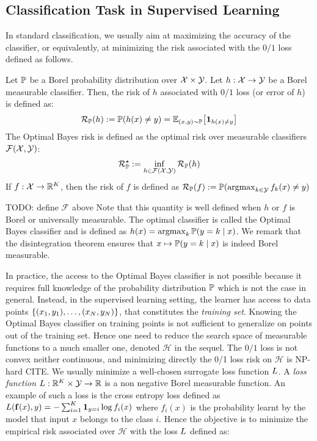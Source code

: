 \subsection{Classification Task in Supervised Learning}


In standard classification, we usually aim at maximizing the accuracy of the classifier, or equivalently, at minimizing the risk associated with the $0/1$ loss defined as follows.

    
\begin{definition} Let $\mathbb{P}$ be a Borel probability distribution over $\mathcal{X}\times\mathcal{Y}$. Let $h:\mathcal{X}\to\mathcal{Y}$ be a Borel measurable classifier. Then, the risk of $h$ associated with $0/1$ loss (or error of $h$) is defined as:
\begin{align}
   \risk_{\PP}(h):=\PP(h(x)\neq y) = \EE_{(x,y)\sim\PP}\left[\mathbf{1}_{h(x)\neq y}\right]
\end{align}
The Optimal Bayes risk is defined as the optimal risk over measurable classifiers $\mathcal{F}(\mathcal{X},\mathcal{Y})$:
\begin{align}
    \mathcal{R}^\star_{\mathbb{P}}:=\inf_{h\in\mathcal{F}(\mathcal{X},\mathcal{Y})}\mathcal{R}_{\mathbb{P}}(h)
 \end{align}
If $f:\mathcal{X}\to\mathbb{R}^K$, then the risk of $f$ is defined as $\mathcal{R}_{\mathbb{P}}(f):=\mathbb{P}(\operatorname*{argmax}_{k\in\mathcal{Y}}f_k(x)\neq y)$
\end{definition}
TODO: define $\mathcal{F}$ above
Note that this quantity is well defined when $h$ or $f$ is Borel or universally measurable. The optimal classifier is called the Optimal Bayes  classifier and is defined as $h(x) = \operatorname*{argmax}_k\mathbb{P}(y=k\mid x)$. We remark that the disintegration theorem ensures that $x\mapsto \mathbb{P}(y=k\mid x)$ is indeed Borel measurable. 

In practice, the access to the Optimal Bayes  classifier is not possible because it requires full knowledge of the probability distribution $\mathbb{P}$ which is not the case in general. Instead, in the supervised learning setting, the learner has access to data points $\{(x_1,y_1),\dots,(x_N,y_N)\}$, that constitutes the \emph{training set}. Knowing the Optimal Bayes classifier on training points is not sufficient to generalize on points out of the training set. Hence one need to reduce the search space of measurable functions to a much smaller one, denoted $\mathcal{H}$ in the sequel. The $0/1$ loss is not convex neither continuous, and minimizing directly the 0/1 loss risk  on $\mathcal{H}$ is  NP-hard CITE. We usually minimize a well-chosen surrogate loss function $L$. A \textit{loss function} $L:\mathbb{R}^K\times\mathcal{Y}\to\mathbb{R}$ is a non negative Borel measurable function. An example of such a loss is the cross entropy loss defined as $L(\mathbf{f}(x),y)=-\sum_{i=1}^K \mathbf{1}_{y=i}\log f_i(x)$
where $f_i(x)$ is the probability learnt by the model that input $x$ belongs to the class $i$. Hence the objective is to minimize the empirical risk associated over $\mathcal{H}$ with the loss $L$  defined as:

